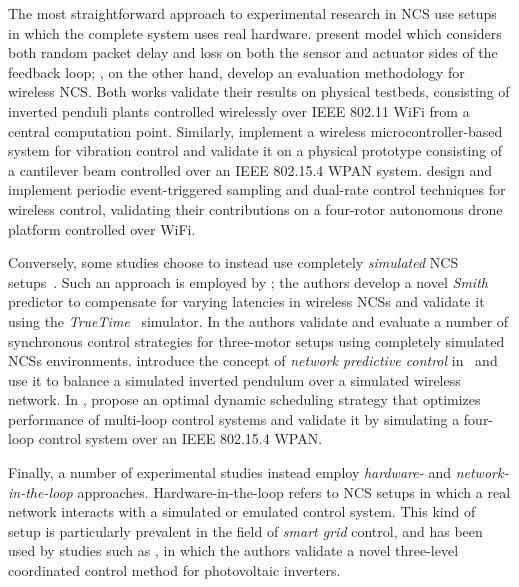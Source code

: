 The most straightforward approach to experimental research in \ac{NCS} use setups in which the complete system uses real hardware.
\textcite{Drew2005NCSWLAN} present  model which considers both random packet delay and loss on both the sensor and actuator sides of the feedback loop; \textcite{Baumann2018LowPower}, on the other hand, develop an evaluation methodology for wireless \ac{NCS}.
Both works validate their results on physical testbeds, consisting of inverted penduli plants controlled wirelessly over IEEE 802.11 WiFi from a central computation point.
Similarly, \textcite{Li2014Wireless} implement a wireless microcontroller-based system for vibration control and validate it on a physical prototype consisting of a cantilever beam controlled over an IEEE 802.15.4 \ac{WPAN} system.
\textcite{Cuenca2019UAV} design and implement periodic event-triggered sampling and dual-rate control techniques for wireless control, validating their contributions on a four-rotor autonomous drone platform controlled over WiFi.

Conversely, some studies choose to instead use completely \emph{simulated} \ac{NCS} setups~\cite{Andersson2005Simulation,Eyisi2012NCSWT}.
Such an approach is employed by \textcite{Du2009Smith}; the authors develop a novel \emph{Smith} predictor to compensate for varying latencies in wireless \acp{NCS} and validate it using the \emph{TrueTime}~\cite{Henriksson2002TrueTime} simulator.
In \textcite{Chen2015synccontrol} the authors validate and evaluate a number of synchronous control strategies for three-motor setups using completely simulated \acp{NCS} environments.
\citeauthor{Wu2012NPC} introduce the concept of \emph{network predictive control} in\ \cite{Wu2012NPC} and use it to balance a simulated inverted pendulum over a simulated wireless network.
In \cite{Ma2019DynamicSched}, \citeauthor{Ma2019DynamicSched} propose an optimal dynamic scheduling strategy that optimizes performance of multi-loop control systems and validate it by simulating a four-loop control system over an IEEE 802.15.4 \ac{WPAN}.


Finally, a number of experimental studies instead employ \emph{hardware-} and \emph{network-in-the-loop} approaches.
Hardware-in-the-loop refers to \ac{NCS} setups in which a real network interacts with a simulated or emulated control system.
This kind of setup is particularly prevalent in the field of \emph{smart grid} control, and has been used by studies such as \textcite{Wang2020VoltageControl}, in which the authors validate a novel three-level coordinated control method for photovoltaic inverters.

